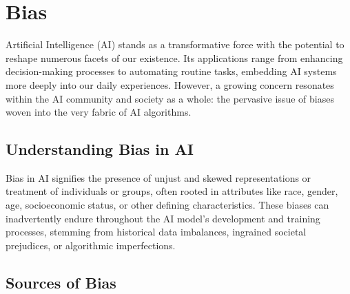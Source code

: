 \documentclass[12pt,a4paper,openright,twoside]{book}
\begin{document}
\section{Bias}
Artificial Intelligence (AI) stands as a transformative force with the potential to reshape numerous facets of our existence. Its applications range from enhancing decision-making processes to automating routine tasks, embedding AI systems more deeply into our daily experiences. However, a growing concern resonates within the AI community and society as a whole: the pervasive issue of biases woven into the very fabric of AI algorithms. \cite{10.1145/3308560.3317590}

\subsection{Understanding Bias in AI}
Bias in AI signifies the presence of unjust and skewed representations or treatment of individuals or groups, often rooted in attributes like race, gender, age, socioeconomic status, or other defining characteristics. These biases can inadvertently endure throughout the AI model's development and training processes, stemming from historical data imbalances, ingrained societal prejudices, or algorithmic imperfections.

\subsection{Sources of Bias}
\end{document}
